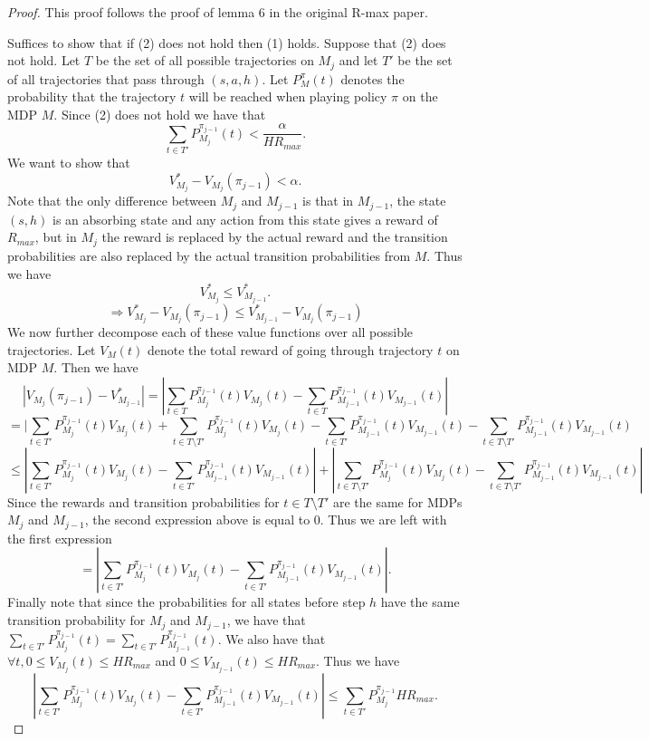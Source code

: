 \documentclass[12pt, letterpaper]{article}
\theoremstyle{definition}
\theoremstyle{remark}
\begin{document}
\begin{proof}[Proof]
    This proof follows the proof of lemma 6 in the original R-max paper.

    Suffices to show that if (2) does not hold then (1) holds. Suppose that (2) does not hold. Let \(T\) be the set of all possible trajectories on \(M_{j}\) and let \(T'\) be the set of all trajectories that pass through \((s, a, h)\). Let \(P_M^{\pi}(t)\) denotes the probability that the trajectory \(t\) will be reached when playing policy \(\pi\) on the MDP \(M\).  Since (2) does not hold we have that
    \[\sum_{t \in T'} P_{M_j}^{\pi_{j-1}}(t) < \frac{\alpha}{H R_{max}}.\]
    We want to show that
    \[V^*_{M_j} - V_{M_j}(\pi_{j-1}) < \alpha.\]
    Note that the only difference between \(M_j\) and \(M_{j-1}\) is that in \(M_{j-1}\), the state \((s, h)\) is an absorbing state and any action from this state gives a reward of \(R_{max}\), but in \(M_j\) the reward is replaced by the actual reward and the transition probabilities are also replaced by the actual transition probabilities from \(M\). Thus we have
    \[V^*_{M_j} \leq V^*_{M_{j-1}}.\]
    \[\Rightarrow V^*_{M_j} - V_{M_j}(\pi_{j-1}) \leq V^*_{M_{j-1}} - V_{M_j}(\pi_{j-1})\]
    We now further decompose each of these value functions over all possible trajectories. Let \(V_{M}(t)\) denote the total reward of going through trajectory \(t\) on MDP \(M\). Then we have
    \[ |V_{M_j}(\pi_{j-1}) - V_{M_{j-1}}^* | = |\sum_{t \in T} P_{M_j}^{\pi_{j-1}}(t) V_{M_j}(t) - \sum_{t \in T} P_{M_{j-1}}^{\pi_{j-1}}(t) V_{M_{j-1}}(t)|\]
    \[= |\sum_{t \in T'} P_{M_j}^{\pi_{j-1}}(t) V_{M_j}(t) + \sum_{t \in T \setminus T'} P_{M_j}^{\pi_{j-1}}(t) V_{M_j}(t) - \sum_{t \in T'} P_{M_{j-1}}^{\pi_{j-1}}(t) V_{M_{j-1}}(t) - \sum_{t \in T \setminus T'} P_{M_{j-1}}^{\pi_{j-1}}(t) V_{M_{j-1}}(t)\]
    \[\leq |\sum_{t \in T'} P_{M_j}^{\pi_{j-1}}(t) V_{M_j}(t) - \sum_{t \in T'} P_{M_{j-1}}^{\pi_{j-1}}(t) V_{M_{j-1}}(t)| + |\sum_{t \in T \setminus T'} P_{M_j}^{\pi_{j-1}}(t) V_{M_j}(t) -  \sum_{t \in T \setminus T'} P_{M_{j-1}}^{\pi_{j-1}}(t) V_{M_{j-1}}(t)|\]
    Since the rewards and transition probabilities for \(t \in T \setminus T'\) are the same for MDPs \(M_j\) and \(M_{j-1}\), the second expression above is equal to 0. Thus we are left with the first expression
    \[= |\sum_{t \in T'} P_{M_j}^{\pi_{j-1}}(t) V_{M_j}(t) - \sum_{t \in T'} P_{M_{j-1}}^{\pi_{j-1}}(t) V_{M_{j-1}}(t)|.\]
    Finally note that since the probabilities for all states before step \(h\) have the same transition probability for \(M_j\) and \(M_{j-1}\), we have that \(\sum_{t \in T'} P_{M_j}^{\pi_{j-1}}(t) = \sum_{t \in T'} P_{M_{j-1}}^{\pi_{j-1}}(t)\). We also have that \(\forall t, 0 \leq V_{M_j}(t) \leq HR_{max}\) and \(0 \leq V_{M_{j-1}}(t) \leq HR_{max}\). Thus we have
    \[|\sum_{t \in T'} P_{M_j}^{\pi_{j-1}}(t) V_{M_j}(t) - \sum_{t \in T'} P_{M_{j-1}}^{\pi_{j-1}}(t) V_{M_{j-1}}(t)| \leq \sum_{t \in T'} P_{M_j}^{\pi_{j-1}} H R_{max}.\]


\end{proof}
\end{document}
